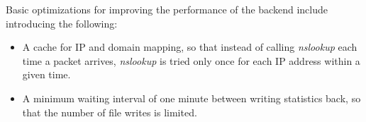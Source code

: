 Basic optimizations for improving the performance of the backend include introducing the following:
\begin{itemize}
	
	\item A cache for IP and domain mapping, so that instead of calling \textit{nslookup} each time a packet arrives, \textit{nslookup} is tried only once for each IP address within a given time.
	
	\item A minimum waiting interval of one minute between writing statistics back, so that the number of file writes is limited.
	
\end{itemize}